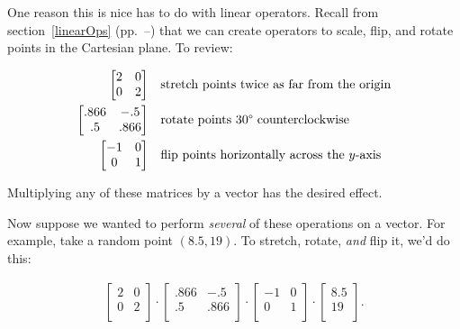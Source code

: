 One reason this is nice has to do with linear operators. Recall from
section~\ref{linearOps} (pp.~\pageref{linearOps}--\pageref{endLinearOps}) that
we can create operators to scale, flip, and rotate points in the Cartesian
plane. To review:

\vspace{-.15in}
\begin{align*}
\begin{bmatrix}
2 & 0 \\
0 & 2 \\
\end{bmatrix}
\quad & \text{stretch points twice as far from the origin}\\
\begin{bmatrix}
.866 & -.5 \\
.5 & .866 \\
\end{bmatrix}
\quad & \text{rotate points 30\degree\ counterclockwise}\\
\begin{bmatrix}
-1 & 0 \\
0 & 1 \\
\end{bmatrix}
\quad & \text{flip points horizontally across the $y$-axis}\\
\end{align*}
\vspace{-.15in}

Multiplying any of these matrices by a vector has the desired effect.

\medskip

Now suppose we wanted to perform \textit{several} of these operations on a
vector. For example, take a random point $(8.5, 19)$. To stretch, rotate,
\textit{and} flip it, we'd do this:

\vspace{-.15in}
\begin{align*}
\begin{bmatrix}
2 & 0 \\
0 & 2 \\
\end{bmatrix} \cdot
\begin{bmatrix}
.866 & -.5 \\
.5 & .866 \\
\end{bmatrix} \cdot
\begin{bmatrix}
-1 & 0 \\
0 & 1 \\
\end{bmatrix} \cdot
\begin{bmatrix}
8.5 \\
19 \\
\end{bmatrix}.
\end{align*}
\vspace{-.15in}

